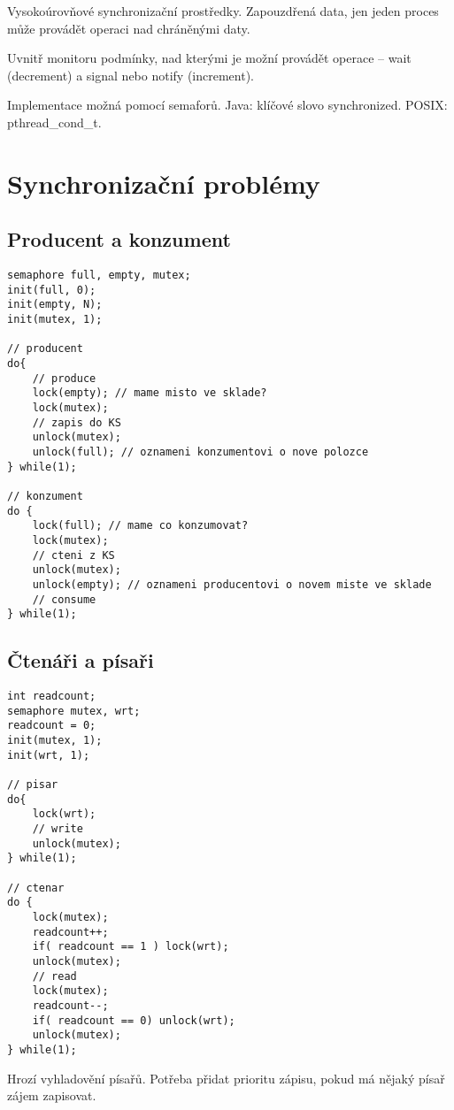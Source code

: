 \documentclass[a4wide]{report}
\begin{document}
Vysokoúrovňové synchronizační prostředky. Zapouzdřená data, jen jeden proces může provádět operaci nad chráněnými daty.

Uvnitř monitoru podmínky, nad kterými je možní provádět operace -- wait (decrement) a signal nebo notify (increment).

Implementace možná pomocí semaforů. Java: klíčové slovo synchronized. POSIX: pthread\_cond\_t.

\section{Synchronizační problémy}

\subsection{Producent a konzument}

\begin{lstlisting}
semaphore full, empty, mutex;
init(full, 0);
init(empty, N);
init(mutex, 1);

// producent
do{
	// produce
	lock(empty); // mame misto ve sklade?
	lock(mutex);
	// zapis do KS
	unlock(mutex);
	unlock(full); // oznameni konzumentovi o nove polozce
} while(1);

// konzument
do {
	lock(full); // mame co konzumovat?
	lock(mutex);
	// cteni z KS
	unlock(mutex);
	unlock(empty); // oznameni producentovi o novem miste ve sklade
	// consume
} while(1);
\end{lstlisting}

\subsection{Čtenáři a písaři}

\begin{lstlisting}
int readcount;
semaphore mutex, wrt;
readcount = 0;
init(mutex, 1);
init(wrt, 1);

// pisar
do{
	lock(wrt);
	// write
	unlock(mutex);
} while(1);

// ctenar
do {
	lock(mutex);
	readcount++;
	if( readcount == 1 ) lock(wrt);
	unlock(mutex);
	// read
	lock(mutex);
	readcount--;
	if( readcount == 0) unlock(wrt);
	unlock(mutex);
} while(1);
\end{lstlisting}

Hrozí vyhladovění písařů. Potřeba přidat prioritu zápisu, pokud má nějaký písař zájem zapisovat.
\end{document}
